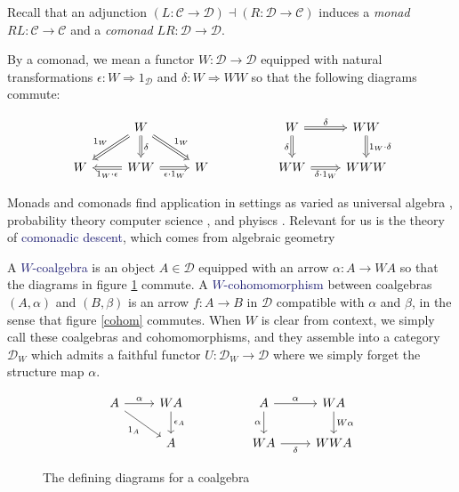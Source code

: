 \documentclass[12pt]{article}
\theoremstyle{definition}
\theoremstyle{theorem}
\newcommand*{\catVarFont}[1]{\mathcal{#1}}
\newcommand{\catC}{\catVarFont{C}}
\newcommand{\catD}{\catVarFont{D}}
\newcommand*{\important}[1]{\textcolor{MidnightBlue}{#1}}
\begin{document}

Recall that an adjunction
$(L : \catC \to \catD) \dashv (R : \catD \to \catC)$
induces a \emph{monad} $RL : \catC \to \catC$ and a \emph{comonad}
$LR : \catD \to \catD$.

By a comonad, we mean a functor $W : \catD \to \catD$ equipped with natural
transformations $\epsilon : W \Rightarrow 1_\catD$ and $\delta : W \Rightarrow WW$
so that the following diagrams commute:

\[
    \begin{tikzcd}
    & W &&& W & WW \\
    W & WW & W && WW & WWW
    \arrow["{1_W \cdot \epsilon}", Rightarrow, from=2-2, to=2-1]
    \arrow["{\epsilon \cdot 1_W}"', Rightarrow, from=2-2, to=2-3]
    \arrow["\delta", Rightarrow, from=1-2, to=2-2]
    \arrow["{1_W}"', Rightarrow, from=1-2, to=2-1]
    \arrow["{1_W}", Rightarrow, from=1-2, to=2-3]
    \arrow["\delta"', Rightarrow, from=1-5, to=2-5]
    \arrow["\delta", Rightarrow, from=1-5, to=1-6]
    \arrow["{\delta \cdot 1_W}"', Rightarrow, from=2-5, to=2-6]
    \arrow["{1_W \cdot \delta}", Rightarrow, from=1-6, to=2-6]
    \end{tikzcd}
\]

Monads and comonads find application in settings as varied as universal algebra 
, probability theory 
computer science ,
and phyiscs .
Relevant for us is the theory of \important{comonadic descent}, 
which comes from algebraic geometry 

A \important{$W$-coalgebra} is an object
$A \in \catD$ equipped with an arrow $\alpha : A \to WA$ so that the
diagrams in figure \ref{coalg} commute. A \important{$W$-cohomomorphism}
between coalgebras $(A,\alpha)$ and $(B,\beta)$ is an arrow $f : A \to B$
in $\mathcal{D}$ compatible with $\alpha$ and $\beta$, in the sense that 
figure \ref{cohom} commutes. When $W$ is clear from context, we simply call these
coalgebras and cohomomorphisms, and they assemble into a category $\catD_W$
which admits a faithful functor $U : \catD_W \to \catD$ where we 
simply forget the structure map $\alpha$.

\begin{figure}
    \caption{The defining diagrams for a coalgebra}
    \label{coalg}
    \[
        \begin{tikzcd}
        A & WA && A & WA \\
        & A && WA & WWA
        \arrow["\alpha", from=1-1, to=1-2]
        \arrow["{\epsilon_A}", from=1-2, to=2-2]
        \arrow["{1_A}"', from=1-1, to=2-2]
        \arrow["\alpha"', from=1-4, to=2-4]
        \arrow["\alpha", from=1-4, to=1-5]
        \arrow["\delta"', from=2-4, to=2-5]
        \arrow["W\alpha", from=1-5, to=2-5]
        \end{tikzcd}
    \]
\end{figure}
\end{document}
